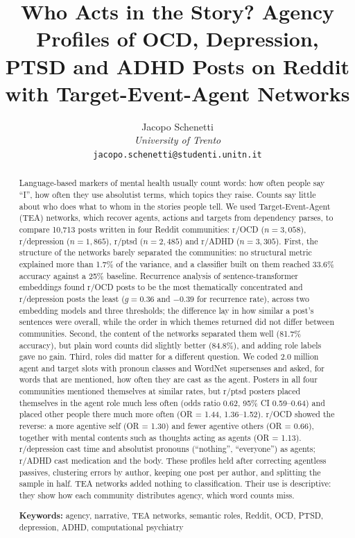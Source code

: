 \documentclass[11pt,a4paper]{article}
\title{Who Acts in the Story? Agency Profiles of OCD, Depression, PTSD and ADHD Posts on Reddit with Target-Event-Agent Networks}
\author{
Jacopo Schenetti\\
\textit{University of Trento}\\
\texttt{jacopo.schenetti@studenti.unitn.it}
}
\date{}
\begin{document}
\maketitle

\begin{abstract}
Language-based markers of mental health usually count words: how often people say ``I'', how often they use absolutist terms, which topics they raise. Counts say little about who does what to whom in the stories people tell. We used Target-Event-Agent (TEA) networks, which recover agents, actions and targets from dependency parses, to compare 10,713 posts written in four Reddit communities: r/OCD ($n = 3{,}058$), r/depression ($n = 1{,}865$), r/ptsd ($n = 2{,}485$) and r/ADHD ($n = 3{,}305$). First, the structure of the networks barely separated the communities: no structural metric explained more than 1.7\% of the variance, and a classifier built on them reached 33.6\% accuracy against a 25\% baseline. Recurrence analysis of sentence-transformer embeddings found r/OCD posts to be the most thematically concentrated and r/depression posts the least ($g = 0.36$ and $-0.39$ for recurrence rate), across two embedding models and three thresholds; the difference lay in how similar a post's sentences were overall, while the order in which themes returned did not differ between communities. Second, the content of the networks separated them well (81.7\% accuracy), but plain word counts did slightly better (84.8\%), and adding role labels gave no gain. Third, roles did matter for a different question. We coded 2.0 million agent and target slots with pronoun classes and WordNet supersenses and asked, for words that are mentioned, how often they are cast as the agent. Posters in all four communities mentioned themselves at similar rates, but r/ptsd posters placed themselves in the agent role much less often (odds ratio 0.62, 95\% CI 0.59--0.64) and placed other people there much more often (OR = 1.44, 1.36--1.52). r/OCD showed the reverse: a more agentive self (OR = 1.30) and fewer agentive others (OR = 0.66), together with mental contents such as thoughts acting as agents (OR = 1.13). r/depression cast time and absolutist pronouns (``nothing'', ``everyone'') as agents; r/ADHD cast medication and the body. These profiles held after correcting agentless passives, clustering errors by author, keeping one post per author, and splitting the sample in half. TEA networks added nothing to classification. Their use is descriptive: they show how each community distributes agency, which word counts miss.

\medskip\noindent\textbf{Keywords:} agency, narrative, TEA networks, semantic roles, Reddit, OCD, PTSD, depression, ADHD, computational psychiatry
\end{abstract}
\end{document}
